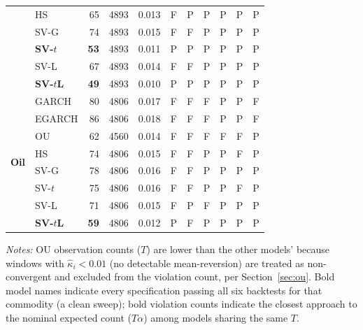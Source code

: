 \documentclass[preprint,12pt,authoryear]{elsarticle}
\begin{document}
\begin{table}[htbp]
\begin{tabular}{ll rr r ccc ccc}
  & HS         & 65  & 4893 & 0.013 & F & P & P & P & P & P \\
  & SV-G       & 74  & 4893 & 0.015 & F & F & P & P & P & P \\
  & \textbf{SV-$t$}& \textbf{53} & 4893 & 0.011 & P & P & P & P & P & P \\
  & SV-L       & 67  & 4893 & 0.014 & F & F & P & P & P & P \\
  & \textbf{SV-$t$L}    & \textbf{49}  & 4893 & 0.010 & P & P & P & P & P & P \\
\midrule
\multirow{8}{*}{\textbf{Oil}}
  & GARCH      & 80  & 4806 & 0.017 & F & F & F & P & P & F \\
  & EGARCH     & 86  & 4806 & 0.018 & F & F & F & P & P & F \\
  & OU         & 62  & 4560 & 0.014 & F & F & F & F & F & P \\
  & HS         & 74  & 4806 & 0.015 & F & F & P & P & F & P \\
  & SV-G       & 78  & 4806 & 0.016 & F & F & P & P & P & P \\
  & SV-$t$     & 75  & 4806 & 0.016 & F & F & P & P & F & P \\
  & SV-L       & 71  & 4806 & 0.015 & F & P & F & P & P & P \\
  & \textbf{SV-$t$L}    & \textbf{59}  & 4806 & 0.012 & P & F & P & P & P & P \\
\bottomrule
\end{tabular}
\vspace{4pt}
\begin{minipage}{\textwidth}
\small
\textit{Notes:} OU observation counts ($T$) are lower than the other models' because windows with $\hat{\kappa}_i < 0.01$ (no detectable mean-reversion) are treated as non-convergent and excluded from the violation count, per Section~\ref{sec:ou}. Bold model names indicate every specification passing all six backtests for that commodity (a clean sweep); bold violation counts indicate the closest approach to the nominal expected count ($T\alpha$) among models sharing the same $T$.
\end{minipage}
\end{table}
\end{document}
